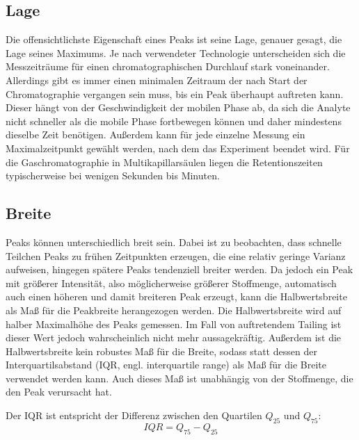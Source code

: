 \subsection{Lage}
Die offensichtlichste Eigenschaft eines Peaks ist seine Lage, genauer gesagt, die Lage seines Maximums. Je nach verwendeter Technologie unterscheiden sich die Messzeiträume für einen chromatographischen Durchlauf stark voneinander. %
Allerdings gibt es immer einen minimalen Zeitraum der nach Start der Chromatographie vergangen sein muss, bis ein Peak überhaupt auftreten kann. Dieser hängt von der Geschwindigkeit der mobilen Phase ab, da sich die Analyte nicht schneller als die mobile Phase fortbewegen können und daher mindestens dieselbe Zeit benötigen. Außerdem kann für jede einzelne Messung ein Maximalzeitpunkt gewählt werden, nach dem das Experiment beendet wird.
Für die Gaschromatographie in Multikapillarsäulen liegen die Retentionszeiten typischerweise bei wenigen Sekunden bis Minuten.


\subsection{Breite}
Peaks können unterschiedlich breit sein. Dabei ist zu beobachten, dass schnelle Teilchen Peaks zu frühen Zeitpunkten erzeugen, die eine relativ geringe Varianz aufweisen, hingegen spätere Peaks tendenziell breiter werden.
Da jedoch ein Peak mit größerer Intensität, also möglicherweise größerer Stoffmenge, automatisch auch einen höheren und damit breiteren Peak erzeugt, kann die Halbwertsbreite als Maß für die Peakbreite herangezogen werden. Die Halbwertsbreite wird auf halber Maximalhöhe des Peaks gemessen. Im Fall von auftretendem Tailing ist dieser Wert jedoch wahrscheinlich nicht mehr aussagekräftig. Außerdem ist die Halbwertsbreite kein robustes Maß für die Breite, sodass statt dessen der Interquartilsabstand (IQR, engl. interquartile range) als Maß für die Breite verwendet werden kann. Auch dieses Maß ist unabhängig von der Stoffmenge, die den Peak verursacht hat. 

Der IQR ist entspricht der Differenz zwischen den Quartilen $Q_{25}$ und $Q_{75}$:
\begin{equation}
IQR = Q_{75} -Q_{25}
\end{equation}

 

